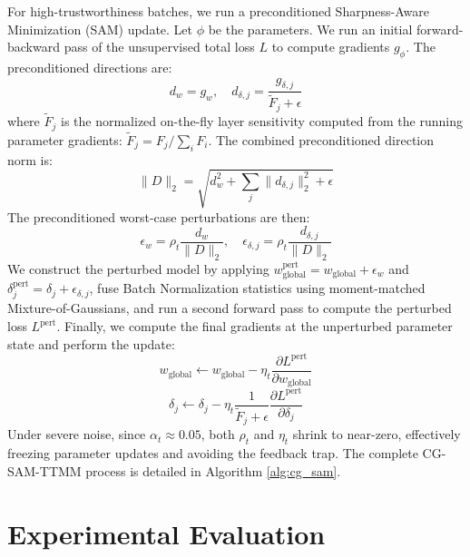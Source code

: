 \documentclass{article}
\theoremstyle{plain}
\theoremstyle{definition}
\theoremstyle{remark}
\begin{document}
For high-trustworthiness batches, we run a preconditioned Sharpness-Aware Minimization (SAM) update. Let $\phi$ be the parameters. We run an initial forward-backward pass of the unsupervised total loss $L$ to compute gradients $g_{\phi}$. The preconditioned directions are:
\begin{equation}
    d_w = g_w, \quad d_{\delta, j} = \frac{g_{\delta, j}}{\tilde{F}_j + \epsilon}
\end{equation}
where $\tilde{F}_j$ is the normalized on-the-fly layer sensitivity computed from the running parameter gradients: $\tilde{F}_j = F_j / \sum_i F_i$. The combined preconditioned direction norm is:
\begin{equation}
    \|D\|_2 = \sqrt{ d_w^2 + \sum_{j} \|d_{\delta, j}\|_2^2 + \epsilon }
\end{equation}
The preconditioned worst-case perturbations are then:
\begin{equation}\label{eq:worst_case_perturbation}
    \epsilon_w = \rho_t \frac{d_w}{\|D\|_2}, \quad \epsilon_{\delta, j} = \rho_t \frac{d_{\delta, j}}{\|D\|_2}
\end{equation}
We construct the perturbed model by applying $w_{\text{global}}^{\text{pert}} = w_{\text{global}} + \epsilon_w$ and $\delta_j^{\text{pert}} = \delta_j + \epsilon_{\delta, j}$, fuse Batch Normalization statistics using moment-matched Mixture-of-Gaussians, and run a second forward pass to compute the perturbed loss $L^{\text{pert}}$. Finally, we compute the final gradients at the unperturbed parameter state and perform the update:
\begin{equation}
    w_{\text{global}} \leftarrow w_{\text{global}} - \eta_t \frac{\partial L^{\text{pert}}}{\partial w_{\text{global}}}
\end{equation}
\begin{equation}
    \delta_j \leftarrow \delta_j - \eta_t \frac{1}{\tilde{F}_j + \epsilon} \frac{\partial L^{\text{pert}}}{\partial \delta_j}
\end{equation}
Under severe noise, since $\alpha_t \approx 0.05$, both $\rho_t$ and $\eta_t$ shrink to near-zero, effectively freezing parameter updates and avoiding the feedback trap. The complete CG-SAM-TTMM process is detailed in Algorithm \ref{alg:cg_sam}.

\section{Experimental Evaluation}
\label{sec:experiments}
\end{document}
